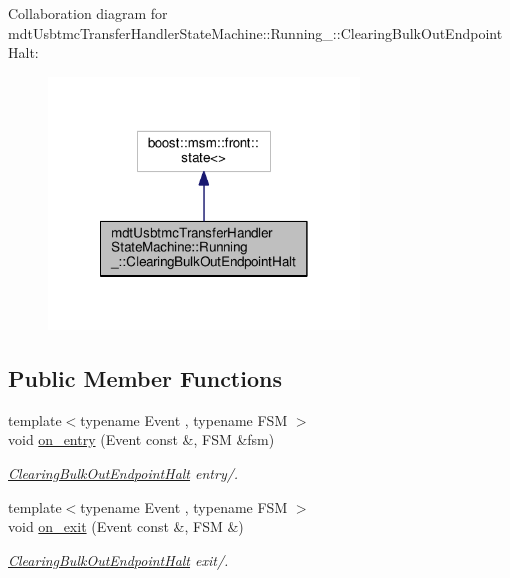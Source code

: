 Collaboration diagram for mdt\-Usbtmc\-Transfer\-Handler\-State\-Machine\-:\-:Running\-\_\-\-:\-:Clearing\-Bulk\-Out\-Endpoint\-Halt\-:\nopagebreak
\begin{figure}[H]
\begin{center}
\leavevmode
\includegraphics[width=234pt]{structmdt_usbtmc_transfer_handler_state_machine_1_1_running___1_1_clearing_bulk_out_endpoint_halt__coll__graph}
\end{center}
\end{figure}
\subsection*{Public Member Functions}
\begin{DoxyCompactItemize}
\item 
{\footnotesize template$<$typename Event , typename F\-S\-M $>$ }\\void \hyperlink{structmdt_usbtmc_transfer_handler_state_machine_1_1_running___1_1_clearing_bulk_out_endpoint_halt_a7ad28cb69a8921cf49143333cb28f2c2}{on\-\_\-entry} (Event const \&, F\-S\-M \&fsm)
\begin{DoxyCompactList}\small\item\em \hyperlink{structmdt_usbtmc_transfer_handler_state_machine_1_1_running___1_1_clearing_bulk_out_endpoint_halt}{Clearing\-Bulk\-Out\-Endpoint\-Halt} entry/. \end{DoxyCompactList}\item 
{\footnotesize template$<$typename Event , typename F\-S\-M $>$ }\\void \hyperlink{structmdt_usbtmc_transfer_handler_state_machine_1_1_running___1_1_clearing_bulk_out_endpoint_halt_a4a65ab22b5ca1535a3ae77bbaed624e4}{on\-\_\-exit} (Event const \&, F\-S\-M \&)
\begin{DoxyCompactList}\small\item\em \hyperlink{structmdt_usbtmc_transfer_handler_state_machine_1_1_running___1_1_clearing_bulk_out_endpoint_halt}{Clearing\-Bulk\-Out\-Endpoint\-Halt} exit/. \end{DoxyCompactList}\end{DoxyCompactItemize}


